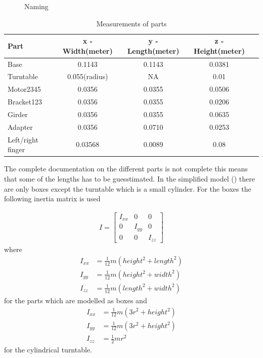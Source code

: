 \begin{figure}[htbp]
  \centering
  
  \caption{Naming}
  \label{fig:naming}
\end{figure}

\begin{table}[htbp]
\centering
\caption{Measurements of parts}
\label{table:measurements}
    \begin{tabular}{l c c c r}
        \toprule
        Part  &  x - Width(meter) & y - Length(meter) & z - Height(meter)\\
        \midrule
        Base & 0.1143 & 0.1143 & 0.0381\\
        Turntable & 0.055(radius) & NA & 0.01\\
        Motor2345 & 0.0356 & 0.0355 & 0.0506 \\
        Bracket123 & 0.0356 & 0.0355 & 0.0206 \\
        Girder & 0.0356 & 0.0355 & 0.0635\\
        Adapter & 0.0356 & 0.0710 & 0.0253\\
        Left/right finger & 0.03568 & 0.0089 & 0.08\\
        \bottomrule
    \end{tabular}
\end{table}


The complete documentation on the different parts is not complete this means that some of the lengths has to be guesstimated. In the simplified model () there are only boxes except the turntable which is a small cylinder. For the boxes the following inertia matrix is used

\begin{align*}
    I = 
    \begin{bmatrix}
        I_{xx} & 0 & 0\\
        0 & I_{yy} & 0\\
        0 & 0 & I_{zz}
    \end{bmatrix}
\end{align*}
where
\begin{align*}
    I_{xx} &= \frac{1}{12}m(height^2+length^2)\\
    I_{yy} &= \frac{1}{12}m(height^2+width^2)\\
    I_{zz} &= \frac{1}{12}m(length^2+width^2)
\end{align*}
for the parts which are modelled as boxes and 
\begin{align*}
    I_{xx} &= \frac{1}{12}m(3r^2+height^2)\\
    I_{yy} &= \frac{1}{12}m(3r^2+height^2)\\
    I_{zz} &= \frac{1}{2}mr^2
\end{align*}
for the cylindrical turntable. 

